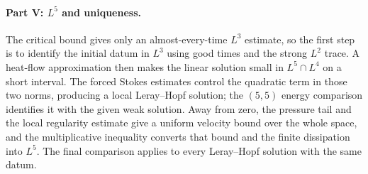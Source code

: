 \documentclass[11pt,letterpaper]{article}
\numberwithin{equation}{section}
\theoremstyle{plain}
\theoremstyle{definition}
\theoremstyle{remark}
\begin{document}
\paragraph{Part V: $L^5$ and uniqueness.}
The critical bound gives only an almost-every-time $L^3$ estimate, so the first step is to identify the initial datum in $L^3$ using good times and the strong $L^2$ trace. A heat-flow approximation then makes the linear solution small in $L^5\cap L^4$ on a short interval. The forced Stokes estimates control the quadratic term in those two norms, producing a local Leray--Hopf solution; the $(5,5)$ energy comparison identifies it with the given weak solution. Away from zero, the pressure tail and the local regularity estimate give a uniform velocity bound over the whole space, and the multiplicative inequality converts that bound and the finite dissipation into $L^5$. The final comparison applies to every Leray--Hopf solution with the same datum.
\end{document}
